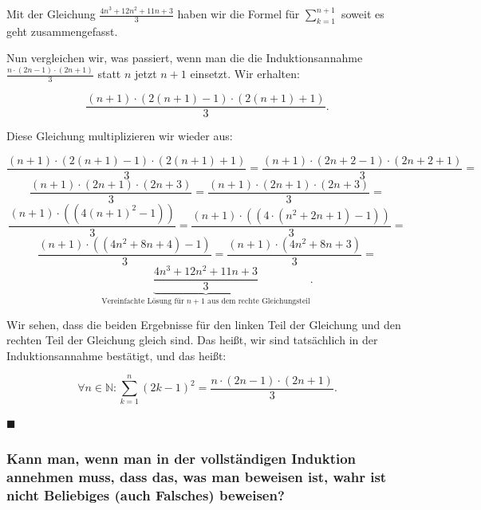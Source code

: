 \documentclass{scrartcl}
\newcommand*{\QEDA}{\hfill\ensuremath{\blacksquare}}%
\begin{document}
Mit der Gleichung $\frac{4n^3 + 12n^2 + 11n + 3}{3}$ haben wir die Formel für $\sum_{k = 1}^{n + 1}$ soweit
es geht zusammengefasst.

Nun vergleichen wir, was passiert, wenn man die die Induktionsannahme $\frac{n\cdot (2n - 1) \cdot (2n + 1)}{3}$
statt $n$ jetzt $n + 1$ einsetzt. Wir erhalten:

\begin{equation}
	\frac{(n + 1)\cdot (2(n + 1) - 1) \cdot (2(n +1) + 1)}{3}.
\end{equation}

Diese Gleichung multiplizieren wir wieder aus:

\begin{equation}
	\frac{(n + 1)\cdot (2(n + 1) - 1) \cdot (2(n +1) + 1)}{3} =
	\frac{(n + 1)\cdot (2n + 2 - 1) \cdot (2n + 2 + 1)}{3} =
\end{equation}
\begin{equation*}
	\frac{(n + 1)\cdot (2n + 1) \cdot (2n + 3)}{3} =
	\frac{(n + 1)\cdot (2n + 1) \cdot (2n + 3)}{3} =
\end{equation*}
\begin{equation*}
	\frac{(n + 1)\cdot ((4(n + 1)^2 - 1))}{3} =
	\frac{(n + 1)\cdot ((4 \cdot (n^2 + 2n +1) - 1))}{3} =
\end{equation*}
\begin{equation*}
	\frac{(n + 1)\cdot ((4n^2 + 8n + 4) - 1)}{3} =
	\frac{(n + 1)\cdot (4n^2 + 8n + 3)}{3} =
\end{equation*}
\begin{equation*}
	\underbrace{\frac{4n^3 + 12n^2 + 11n + 3}{3}}_{\textrm{Vereinfachte\ Lösung\ für\ } n + 1\textrm{\ aus\ dem\ rechte\ Gleichungsteil}}.
\end{equation*}

Wir sehen, dass die beiden Ergebnisse für den linken Teil der Gleichung und den rechten Teil der Gleichung gleich sind.
Das heißt, wir sind tatsächlich in der Induktionsannahme bestätigt, und das heißt:

\begin{equation*}
	\forall n \in \mathbb{N}: \sum_{k = 1}^n (2k - 1)^2 = \frac{n\cdot (2n - 1) \cdot (2n + 1)}{3}.
\end{equation*}

\QEDA

\subsubsection{Kann man, wenn man in der vollständigen Induktion annehmen muss, dass das, was man
beweisen ist, wahr ist nicht Beliebiges (auch Falsches) beweisen?}
\end{document}
